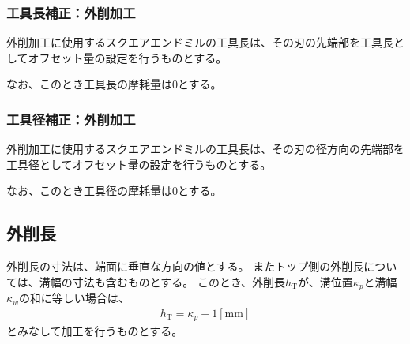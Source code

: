 \subsubsection{工具長補正：外削加工}
外削加工に使用するスクエアエンドミルの工具長は、その刃の先端部を工具長としてオフセット量の設定を行うものとする。

なお、このとき工具長の摩耗量は0とする。


\subsubsection{工具径補正：外削加工}
外削加工に使用するスクエアエンドミルの工具長は、その刃の径方向の先端部を工具径としてオフセット量の設定を行うものとする。

なお、このとき工具径の摩耗量は0とする。


\subsection{外削長}
外削長の寸法は、端面に垂直な方向の値とする。
またトップ側の外削長については、溝幅の寸法も含むものとする。
このとき、外削長$h_\mathrm T$が、溝位置$\kappa_p$と溝幅$\kappa_w$の和に等しい場合は、
\begin{align*}
  h_\mathrm T = \kappa_p+1[\text{mm}]
\end{align*}
とみなして加工を行うものとする。


